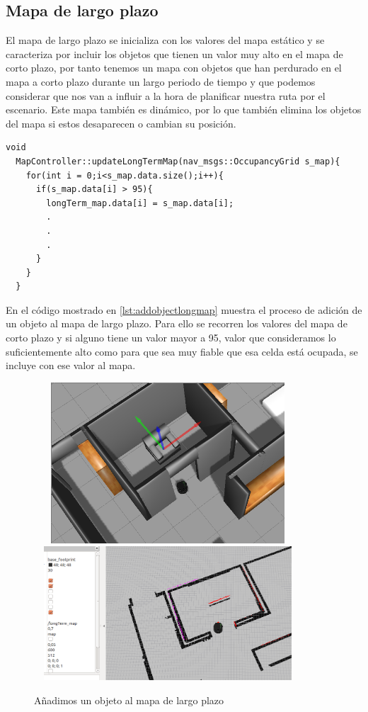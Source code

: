 \subsection{Mapa de largo plazo}
El mapa de largo plazo se inicializa con los valores del mapa estático y se caracteriza por incluir los objetos que tienen un valor muy alto en el mapa de corto plazo, por tanto tenemos un mapa con objetos que han perdurado en el mapa a corto plazo durante un largo periodo de tiempo y que podemos considerar que nos van a influir a la hora de planificar nuestra ruta por el escenario. 
Este mapa también es dinámico, por lo que también elimina los objetos del mapa si estos desaparecen o cambian su posición.
\pagebreak 

\begin{lstlisting}[caption=Procedimiento para añadir un objeto al mapa de largo plazo, label={lst:addobjectlongmap}]
  void
  MapController::updateLongTermMap(nav_msgs::OccupancyGrid s_map){
    for(int i = 0;i<s_map.data.size();i++){
      if(s_map.data[i] > 95){
        longTerm_map.data[i] = s_map.data[i]; 
        .
        .
        .
      }
    }
  }

\end{lstlisting}

En el código mostrado en \ref{lst:addobjectlongmap} muestra el proceso de adición de un objeto al mapa de largo plazo. Para ello se recorren los valores del mapa de corto plazo y si alguno tiene un valor mayor a 95, valor que consideramos lo suficientemente alto como para que sea muy fiable que esa celda está ocupada, se incluye con ese valor al mapa.

\begin{figure}[H]
  \begin{center}
    \includegraphics[width=10cm,height=6cm]{img/cap4/addingobject-gazebo}
    \includegraphics[width=10cm,height=5cm]{img/cap4/addingobject-longmap}
  \end{center}
  \caption{Añadimos un objeto al mapa de largo plazo}
  \label{fig:addobjectlongmap}
\end{figure}
\pagebreak


